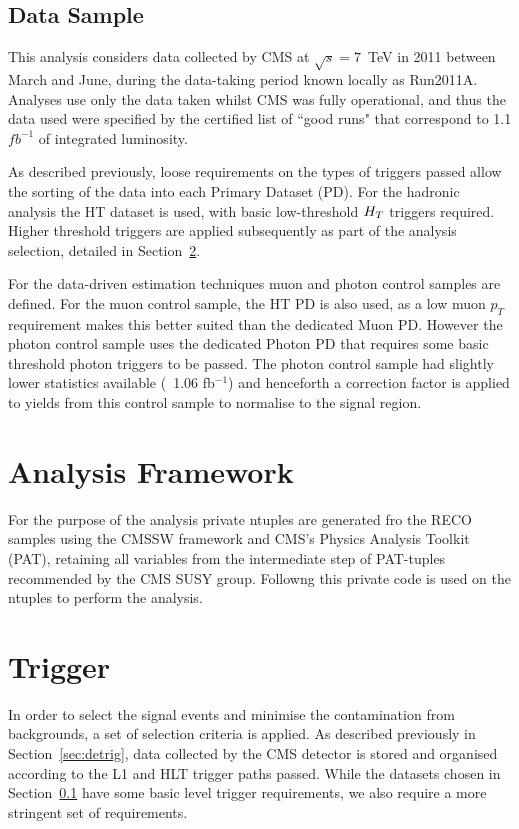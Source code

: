 \subsection{Data Sample}
\label{sec:datasam}
This analysis considers data collected by CMS at $\sqrt{s} = 7$~TeV in 2011 between March and June, during the data-taking period known locally as Run2011A. Analyses use only the data taken whilst CMS was fully operational, and thus the data used were specified by the certified list of ``good runs" that correspond to 1.1$fb^{-1}$ of integrated luminosity. 

As described previously, loose requirements on the types of triggers passed allow the sorting of the data into each Primary Dataset (PD). For the hadronic analysis the HT dataset is used, with basic low-threshold $H_{T} $ triggers required. Higher threshold triggers are applied subsequently as part of the analysis selection, detailed in Section~\ref{sec:trig}. 

For the data-driven estimation techniques muon and photon control samples are defined. For the muon control sample, the HT PD is also used, as a low muon $p_{T}$ requirement makes this better suited than the dedicated Muon PD. However the photon control sample uses the dedicated Photon PD that requires some basic threshold photon triggers to be passed. The photon control sample had slightly lower statistics available (~1.06 fb$^{-1}$) and henceforth a correction factor is applied to yields from this control sample to normalise to the signal region. 


\section{Analysis Framework}

For the purpose of the analysis private ntuples are generated fro the RECO samples using the CMSSW framework and CMS's Physics Analysis Toolkit (PAT), retaining all variables from the intermediate step of PAT-tuples recommended by the CMS SUSY group. Followng this private code is used on the ntuples to perform the analysis.   



\section{Trigger}
\label{sec:trig}
In order to select the signal events and minimise the contamination from backgrounds, a set of selection criteria is applied. As described previously in Section~\ref{sec:detrig}, data collected by the CMS detector is stored and organised according to the L1 and HLT trigger paths passed. While the datasets chosen in Section~\ref{sec:datasam} have some basic level trigger requirements, we also require a more stringent set of requirements. 


